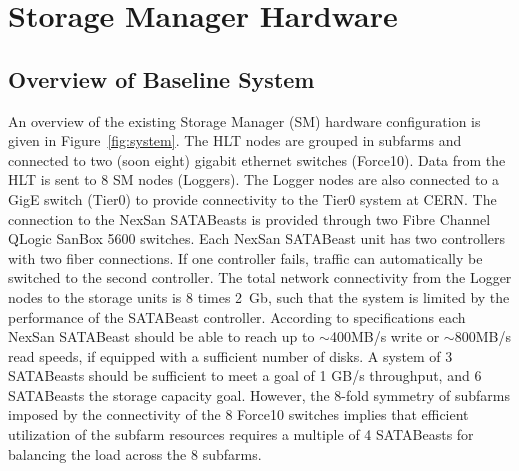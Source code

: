 
\section{\label{sec:stohard}Storage Manager Hardware}  %

\subsection{Overview of Baseline System} 
An overview of the existing  Storage Manager (SM) hardware configuration 
is given in Figure~\ref{fig:system}. 
The HLT nodes are grouped in subfarms and connected to two (soon eight) 
gigabit ethernet switches (Force10). 
Data from the HLT is sent to 8 SM nodes (Loggers). 
The Logger nodes are also connected to a GigE switch (Tier0) to provide connectivity 
to the Tier0 system at CERN.
The connection to the NexSan SATABeasts is provided through two Fibre Channel QLogic SanBox 5600 
switches. Each NexSan SATABeast unit has two controllers with two fiber connections. 
If one controller fails, traffic can automatically be switched to the second controller. 
The total network connectivity from the Logger nodes to the storage units is 8 times 2~Gb, 
such that the system is limited by the performance of the SATABeast controller. 
According to specifications each NexSan SATABeast should be able to reach up to $\sim$400MB/s write 
or $\sim$800MB/s read speeds, if equipped with a sufficient number of disks.
A system of 3 SATABeasts should be sufficient to meet a goal of 1 GB/s throughput,
and 6  SATABeasts the storage capacity goal.
However, the 8-fold symmetry of subfarms imposed by the connectivity 
of the 8 Force10 switches implies that efficient utilization of the subfarm resources
requires a multiple of 4 SATABeasts for balancing the load across the 8 subfarms.

